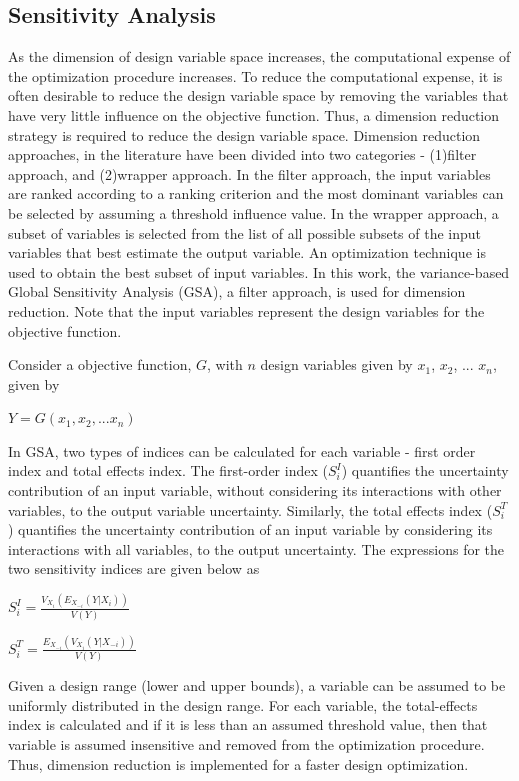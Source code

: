 \documentclass[10pt]{article}
\begin{document}
\subsection{Sensitivity Analysis}
\hspace{5 mm} As the dimension of design variable space increases, the computational expense of the optimization procedure increases. To reduce the computational expense, it is often desirable to reduce the design variable space by removing the variables that have very little influence on the objective function. Thus, a dimension reduction strategy is required to reduce the design variable space. Dimension reduction approaches, in the literature have been divided into two categories - (1)filter approach, and (2)wrapper approach. In the filter approach, the input variables are ranked according to a ranking criterion and the most dominant variables can be selected by assuming a threshold influence value. In the wrapper approach, a subset of variables is selected from the list of all possible subsets of the input variables that best estimate the output variable. An optimization technique is used to obtain the best subset of input variables. In this work, the variance-based Global Sensitivity Analysis (GSA), a filter approach, is used for dimension reduction. Note that the input variables represent the design variables for the objective function. 

\hspace{5 mm} Consider a objective function, $G$, with $n$ design variables given by $x_{1}$, $x_{2}$, ...  $x_{n}$, given by

\centerline{$Y = G(x_{1}, x_{2}, ... x_{n})$}

In GSA, two types of indices can be calculated for each variable - first order index and total effects index. The first-order index ($S_{i}^{I}$) quantifies the uncertainty contribution of an input variable, without considering its interactions with other variables, to the output variable uncertainty. Similarly, the total effects index ($S_{i}^{T}$) quantifies the uncertainty contribution of an input variable by considering its interactions with all variables, to the output uncertainty. The expressions for the two sensitivity indices are given below as 

\centerline{$S_{i}^{I} = \frac{V_{X_i}(E_{X_{-i}}(Y|X_{i}))}{V(Y)}$}
\centerline{$S_{i}^{T} = \frac{E_{X_{-i}}(V_{X_{i}}(Y|X_{-i}))}{V(Y)}$}

Given a design range (lower and upper bounds), a variable can be assumed to be uniformly distributed in the design range. For each variable, the total-effects index is calculated and if it is less than an assumed threshold value, then that variable is assumed insensitive and removed from the optimization procedure. Thus, dimension reduction is implemented for a faster design optimization.\cite{Bioinformatics} \cite{Wrappers} \cite{Error} \cite{Global}
\end{document}
